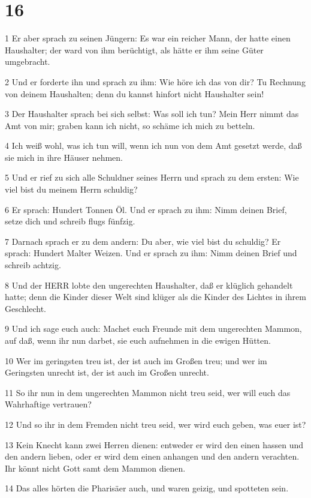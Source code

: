 \chapter{16}

\par 1 Er aber sprach zu seinen Jüngern: Es war ein reicher Mann, der hatte einen Haushalter; der ward von ihm berüchtigt, als hätte er ihm seine Güter umgebracht.
\par 2 Und er forderte ihn und sprach zu ihm: Wie höre ich das von dir? Tu Rechnung von deinem Haushalten; denn du kannst hinfort nicht Haushalter sein!
\par 3 Der Haushalter sprach bei sich selbst: Was soll ich tun? Mein Herr nimmt das Amt von mir; graben kann ich nicht, so schäme ich mich zu betteln.
\par 4 Ich weiß wohl, was ich tun will, wenn ich nun von dem Amt gesetzt werde, daß sie mich in ihre Häuser nehmen.
\par 5 Und er rief zu sich alle Schuldner seines Herrn und sprach zu dem ersten: Wie viel bist du meinem Herrn schuldig?
\par 6 Er sprach: Hundert Tonnen Öl. Und er sprach zu ihm: Nimm deinen Brief, setze dich und schreib flugs fünfzig.
\par 7 Darnach sprach er zu dem andern: Du aber, wie viel bist du schuldig? Er sprach: Hundert Malter Weizen. Und er sprach zu ihm: Nimm deinen Brief und schreib achtzig.
\par 8 Und der HERR lobte den ungerechten Haushalter, daß er klüglich gehandelt hatte; denn die Kinder dieser Welt sind klüger als die Kinder des Lichtes in ihrem Geschlecht.
\par 9 Und ich sage euch auch: Machet euch Freunde mit dem ungerechten Mammon, auf daß, wenn ihr nun darbet, sie euch aufnehmen in die ewigen Hütten.
\par 10 Wer im geringsten treu ist, der ist auch im Großen treu; und wer im Geringsten unrecht ist, der ist auch im Großen unrecht.
\par 11 So ihr nun in dem ungerechten Mammon nicht treu seid, wer will euch das Wahrhaftige vertrauen?
\par 12 Und so ihr in dem Fremden nicht treu seid, wer wird euch geben, was euer ist?
\par 13 Kein Knecht kann zwei Herren dienen: entweder er wird den einen hassen und den andern lieben, oder er wird dem einen anhangen und den andern verachten. Ihr könnt nicht Gott samt dem Mammon dienen.
\par 14 Das alles hörten die Pharisäer auch, und waren geizig, und spotteten sein.
